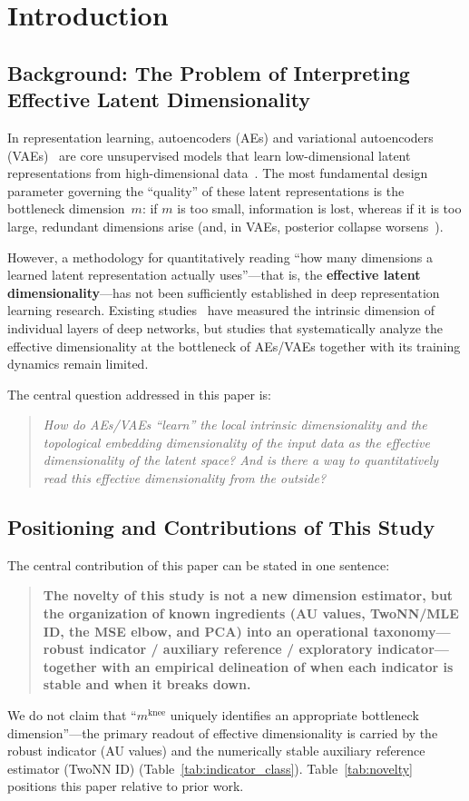 \documentclass[make,article,submit,pdftex,moreauthors]{Definitions/mdpi}
\newcommand{\mknee}{m^{\mathrm{knee}}}
\begin{document}
\section{Introduction}\label{sec:intro}

\subsection{Background: The Problem of Interpreting Effective Latent Dimensionality}\label{sec:intro_bg}

In representation learning, autoencoders (AEs) and
variational autoencoders (VAEs)~\cite{kingma2014vae} are
core unsupervised models that learn low-dimensional latent representations
from high-dimensional data~\cite{bengio2013representation}.
The most fundamental design parameter governing the ``quality'' of these
latent representations is the bottleneck dimension~$m$:
if $m$ is too small, information is lost, whereas if it is too large,
redundant dimensions arise (and, in VAEs, posterior collapse
worsens~\cite{lucas2019elbo}).

However, a methodology for quantitatively reading ``how many dimensions a
learned latent representation actually uses''---that is, the
\textbf{effective latent dimensionality}---has not been sufficiently
established in deep representation learning research.
Existing studies~\cite{ansuini2019intrinsic,valeriani2023geometry} have
measured the intrinsic dimension of individual layers of deep networks,
but studies that systematically analyze the effective dimensionality at the
bottleneck of AEs/VAEs together with its training dynamics remain limited.

The central question addressed in this paper is:
\begin{quote}
\textit{How do AEs/VAEs ``learn'' the local intrinsic dimensionality and the
topological embedding dimensionality of the input data as the effective
dimensionality of the latent space?
And is there a way to quantitatively read this effective dimensionality
from the outside?}
\end{quote}

\subsection{Positioning and Contributions of This Study}\label{sec:intro_aim}

The central contribution of this paper can be stated in one sentence:
\begin{quote}
\textbf{The novelty of this study is not a new dimension estimator, but the
organization of known ingredients (AU values, TwoNN/MLE ID, the MSE elbow, and
PCA) into an operational taxonomy---robust indicator / auxiliary reference /
exploratory indicator---together with an empirical delineation of when each
indicator is stable and when it breaks down.}
\end{quote}
We do not claim that ``$\mknee$ uniquely identifies an appropriate
bottleneck dimension''---the primary readout of effective dimensionality is
carried by the robust indicator (AU values) and the numerically stable
auxiliary reference estimator (TwoNN ID) (Table~\ref{tab:indicator_class}).
Table~\ref{tab:novelty} positions this paper relative to prior work.
\end{document}
